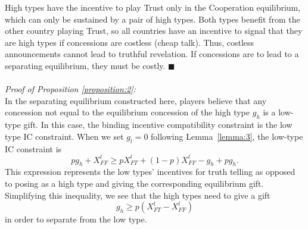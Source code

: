 \documentclass[bibtex,autowc]{apsr_submission}
\newcommand{\be}{\begin{equation}}
\newcommand{\ee}{\end{equation}}
\begin{document}
{High types have the incentive to play Trust only in the Cooperation equilibrium, which can only be sustained by a pair of high types. Both types benefit from the other country playing Trust, so all countries have an incentive to signal that they are high types if concessions are costless (cheap talk). Thus, costless announcements cannot lead to truthful revelation. If concessions are to lead to a separating equilibrium, they must be costly. \hfill $\blacksquare$
\\
\\
\emph{Proof of Proposition \ref{proposition:2}:}\\
In the separating equilibrium constructed here, players believe that any concession not equal to the equilibrium concession of the high type $g_h$ is a low-type gift. In this case, the binding incentive compatibility constraint is the low type IC constraint. When we set $g_l=0$ following Lemma~\ref{lemma:3}, the low-type IC constraint is\\  
\begin{equation*}
	pg_h +X_{FF}^l \geq pX_{FT}^l+(1-p)X_{FF}^l-g_h+pg_h.
\end{equation*}
This expression represents the low types' incentives for truth telling as opposed to posing as a high type and giving the corresponding equilibrium gift. Simplifying this inequality, we see that the high types need to give a gift 
\be
	g_h \geq p(X_{FT}^l-X_{FF}^l)
	\label{eq:cse}
\ee 
in order to separate from the low type.

}
\end{document}
